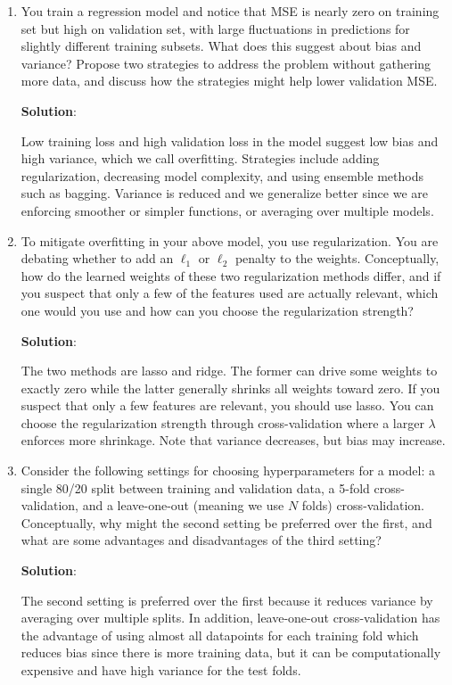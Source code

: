\documentclass[11pt, letterpaper]{article}
\theoremstyle{definition}
\theoremstyle{plain}
\newenvironment{solution}{
    \vspace{2mm}
    \color{blue}\noindent\textbf{Solution}:
}{}
\begin{document}
\begin{mdframed}
    \begin{enumerate}
        \item You train a regression model and notice that MSE is nearly zero on training set but high on validation set, with large fluctuations in predictions for slightly different training subsets. What does this suggest about bias and variance? Propose two strategies to address the problem without gathering more data, and discuss how the strategies might help lower validation MSE.
        
        \begin{solution}
            Low training loss and high validation loss in the model suggest low bias and high variance, which we call overfitting. Strategies include adding regularization, decreasing model complexity, and using ensemble methods such as bagging. Variance is reduced and we generalize better since we are enforcing smoother or simpler functions, or averaging over multiple models.
        \end{solution}

        \item To mitigate overfitting in your above model, you use regularization. You are debating whether to add an $\ell_1$ or $\ell_2$ penalty to the weights. Conceptually, how do the learned weights of these two regularization methods differ, and if you suspect that only a few of the features used are actually relevant, which one would you use and how can you choose the regularization strength?
        
        \begin{solution}
            The two methods are lasso and ridge. The former can drive some weights to exactly zero while the latter generally shrinks all weights toward zero. If you suspect that only a few features are relevant, you should use lasso. You can choose the regularization strength through cross-validation where a larger $\lambda$ enforces more shrinkage. Note that variance decreases, but bias may increase.
        \end{solution}

        \item Consider the following settings for choosing hyperparameters for a model: a single 80/20 split between training and validation data, a 5-fold cross-validation, and a leave-one-out (meaning we use $N$ folds) cross-validation. Conceptually, why might the second setting be preferred over the first, and what are some advantages and disadvantages of the third setting?
        
        \begin{solution}
            The second setting is preferred over the first because it reduces variance by averaging over multiple splits. In addition, leave-one-out cross-validation has the advantage of using almost all datapoints for each training fold which reduces bias since there is more training data, but it can be computationally expensive and have high variance for the test folds.
        \end{solution}

    \end{enumerate}
\end{mdframed}
\end{document}
